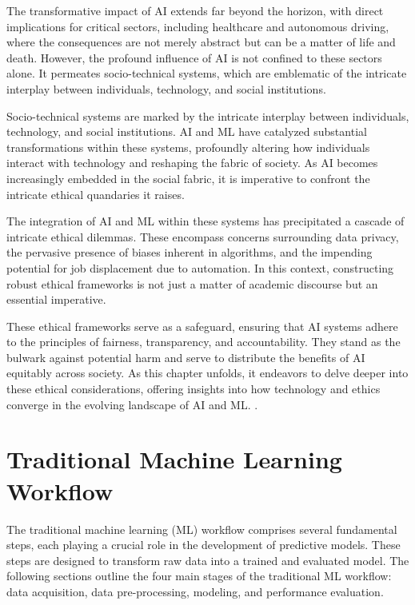 \documentclass[12pt,a4paper,openright,twoside]{book}
\begin{document}
The transformative impact of AI extends far beyond the horizon, with direct implications for critical sectors, including healthcare and autonomous driving, where the consequences are not merely abstract but can be a matter of life and death. However, the profound influence of AI is not confined to these sectors alone. It permeates socio-technical systems, which are emblematic of the intricate interplay between individuals, technology, and social institutions. 

Socio-technical systems are marked by the intricate interplay between individuals, technology, and social institutions. AI and ML have catalyzed substantial transformations within these systems, profoundly altering how individuals interact with technology and reshaping the fabric of society. As AI becomes increasingly embedded in the social fabric, it is imperative to confront the intricate ethical quandaries it raises. 

The integration of AI and ML within these systems has precipitated a cascade of intricate ethical dilemmas. These encompass concerns surrounding data privacy, the pervasive presence of biases inherent in algorithms, and the impending potential for job displacement due to automation. In this context, constructing robust ethical frameworks is not just a matter of academic discourse but an essential imperative. 

These ethical frameworks serve as a safeguard, ensuring that AI systems adhere to the principles of fairness, transparency, and accountability. They stand as the bulwark against potential harm and serve to distribute the benefits of AI equitably across society. As this chapter unfolds, it endeavors to delve deeper into these ethical considerations, offering insights into how technology and ethics converge in the evolving landscape of AI and ML. \cite{GRUETZEMACHER2022102884}.

\newpage
\section{Traditional Machine Learning Workflow}

The traditional machine learning (ML) workflow comprises several fundamental steps, each playing a crucial role in the development of predictive models. These steps are designed to transform raw data into a trained and evaluated model. The following sections outline the four main stages of the traditional ML workflow: data acquisition, data pre-processing, modeling, and performance evaluation.
\end{document}
